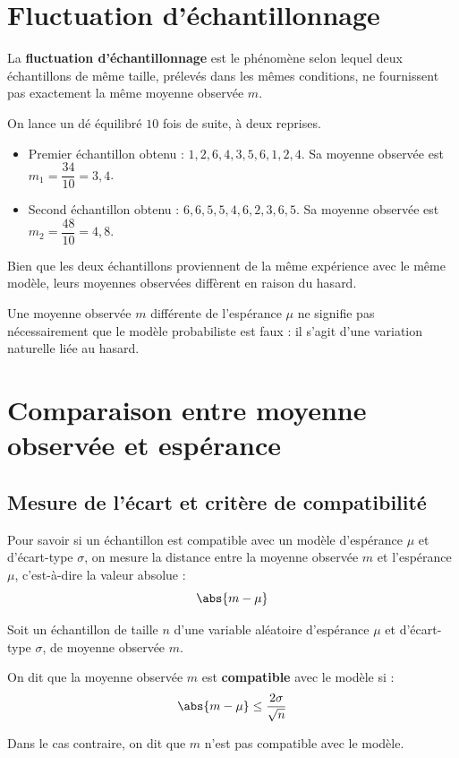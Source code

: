 \section{Fluctuation d'échantillonnage}

\begin{defin}
	La \textbf{fluctuation d'échantillonnage} est le phénomène selon lequel deux échantillons de même taille, prélevés dans les mêmes conditions, ne fournissent pas exactement la même moyenne observée $m$.
\end{defin}

\begin{ex}
	On lance un dé équilibré $10$ fois de suite, à deux reprises.
	\begin{itemize}
		\item Premier échantillon obtenu : $1, 2, 6, 4, 3, 5, 6, 1, 2, 4$. Sa moyenne observée est $m_1 = \dfrac{34}{10} = 3{,}4$.
		\item Second échantillon obtenu : $6, 6, 5, 5, 4, 6, 2, 3, 6, 5$. Sa moyenne observée est $m_2 = \dfrac{48}{10} = 4{,}8$.
	\end{itemize}
	Bien que les deux échantillons proviennent de la même expérience avec le même modèle, leurs moyennes observées diffèrent en raison du hasard.
\end{ex}

\begin{rem}
	Une moyenne observée $m$ différente de l'espérance $\mu$ ne signifie pas nécessairement que le modèle probabiliste est faux : il s'agit d'une variation naturelle liée au hasard.
\end{rem}

\section{Comparaison entre moyenne observée et espérance}

\subsection{Mesure de l'écart et critère de compatibilité}

Pour savoir si un échantillon est compatible avec un modèle d'espérance $\mu$ et d'écart-type $\sigma$, on mesure la distance entre la moyenne observée $m$ et l'espérance $\mu$, c'est-à-dire la valeur absolue :
\[
	\abs{m - \mu}
\]

\begin{definition}
	Soit un échantillon de taille $n$ d'une variable aléatoire d'espérance $\mu$ et d'écart-type $\sigma$, de moyenne observée $m$.

	On dit que la moyenne observée $m$ est \textbf{compatible} avec le modèle si :
	\[
		\abs{m - \mu} \leq \dfrac{2\sigma}{\sqrt{n}}
	\]

	Dans le cas contraire, on dit que $m$ n'est pas compatible avec le modèle.
\end{definition}

